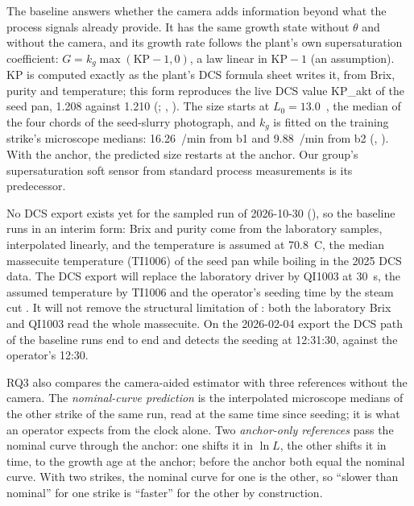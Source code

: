 The baseline answers whether the camera adds information beyond what the process signals already provide. It has
the same growth state without $\theta$ and without the camera, and its growth rate follows the plant's own
supersaturation coefficient: $G = k_g \max(\mathrm{KP} - 1, 0)$, a law linear in $\mathrm{KP} - 1$ (an assumption).
KP is computed exactly as the plant's DCS formula sheet writes it, from Brix, purity and temperature; this form
reproduces the live DCS value KP\_akt of the seed pan, 1.208 against 1.210 (;
, ). The size starts at
$L_0 = 13.0$~\um, the median of the four chords of the seed-slurry photograph, and $k_g$ is fitted on the training
strike's microscope medians: 16.26~\um/min from b1 and 9.88~\um/min from b2 (,
). With the anchor, the predicted size restarts at the anchor. Our group's
supersaturation soft sensor from standard process measurements \citep{Lohani2026} is its predecessor.

No DCS export exists yet for the sampled run of 2026-10-30 (), so the baseline runs in an interim
form: Brix and purity come from the laboratory samples, interpolated linearly, and the temperature is assumed at
70.8~\textdegree C, the median massecuite temperature (TI1006) of the seed pan while boiling in the 2025 DCS data. The
DCS export will replace the laboratory driver by QI1003 at 30~s, the assumed temperature by TI1006 and the operator's
seeding time by the steam cut . It will not remove the
structural limitation of : both the laboratory Brix and QI1003 read the whole massecuite. On
the 2026-02-04 export the DCS path of the baseline runs end to end and detects the seeding at 12:31:30, against the
operator's 12:30.

RQ3 also compares the camera-aided estimator with three references without the camera. The \emph{nominal-curve prediction} is the interpolated microscope medians of the
other strike of the same run, read at the same time since seeding; it is what an operator expects from the clock
alone. Two \emph{anchor-only references} pass the nominal curve through the anchor: one shifts it in $\ln L$, the
other shifts it in time, to the growth age at the anchor; before the anchor both equal the nominal curve. With two
strikes, the nominal curve for one is the other, so ``slower than nominal'' for one strike is ``faster'' for the
other by construction.

